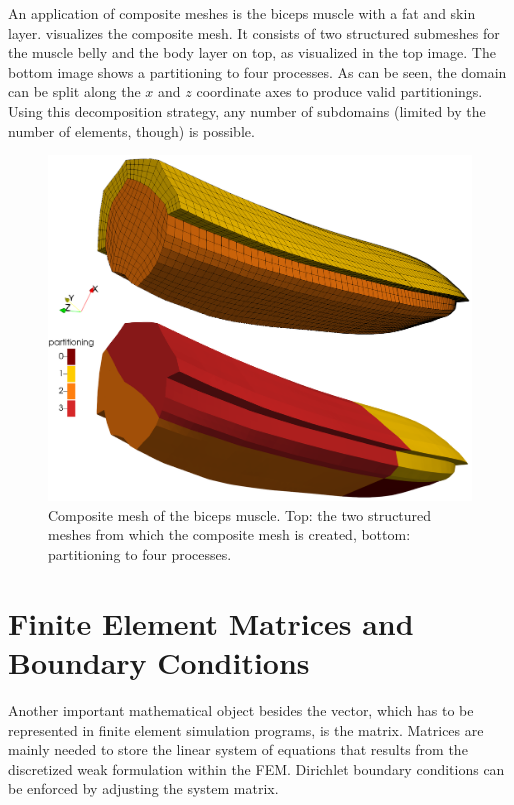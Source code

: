 An application of composite meshes is the biceps muscle with a fat and skin layer.  visualizes the composite mesh. It consists of two structured submeshes for the muscle belly and the body layer on top, as visualized in the top image. The bottom image shows a partitioning to four processes. As can be seen, the domain can be split along the $x$ and $z$ coordinate axes to produce valid partitionings. Using this decomposition strategy, any number of subdomains (limited by the number of elements, though) is possible.

\begin{figure}%
  \centering%
  \includegraphics[width=\textwidth]{images/implementation/composite_muscle_mesh0.png}%
  \caption{Composite mesh of the biceps muscle. Top: the two structured meshes from which the composite mesh is created, bottom: partitioning to four processes.}%
  \label{fig:composite_muscle_mesh0}%
\end{figure}%

\section{Finite Element Matrices and Boundary Conditions}\label{sec:fem_matrices_and_bc}
Another important mathematical object besides the vector, which has to be represented in finite element simulation programs, is the matrix. Matrices are mainly needed to store the linear system of equations that results from the discretized weak formulation within the FEM. Dirichlet boundary conditions can be enforced by adjusting the system matrix.

